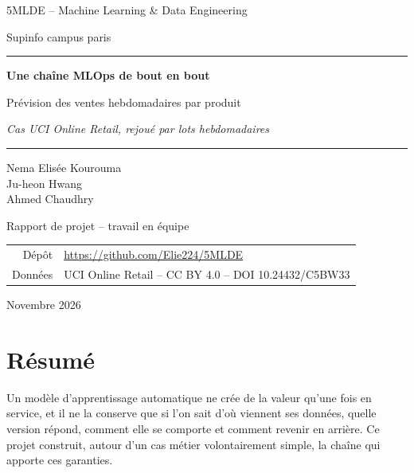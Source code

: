 \documentclass[11pt,a4paper]{article}
\newcommand{\auteur}{Nema Elisée Kourouma \\[2pt] Ju-heon Hwang \\[2pt] Ahmed Chaudhry}
\newcommand{\formation}{5MLDE -- Machine Learning \& Data Engineering}
\newcommand{\etablissement}{Supinfo campus paris}  %
\newcommand{\depot}{https://github.com/Elie224/5MLDE}
\newcommand{\datedoc}{Novembre 2026}
\begin{document}
\begin{titlepage}
  \centering
  \vspace*{1.5cm}
  {\large\color{gris}\formation\par}
  \vspace{0.3cm}
  {\large\color{gris}\etablissement\par}
  \vspace{2.2cm}
  {\color{bleu}\rule{\linewidth}{1pt}\par}
  \vspace{0.5cm}
  {\Huge\bfseries\color{bleu} Une chaîne MLOps de bout en bout\par}
  \vspace{0.4cm}
  {\LARGE Prévision des ventes hebdomadaires par produit\par}
  \vspace{0.3cm}
  {\large\itshape Cas UCI Online Retail, rejoué par lots hebdomadaires\par}
  \vspace{0.5cm}
  {\color{bleu}\rule{\linewidth}{1pt}\par}
  \vspace{2cm}
  {\Large \auteur\par}
  \vspace{0.4cm}
  {\large Rapport de projet -- travail en équipe\par}
  \vfill
  \begin{tabular}{rl}
    Dépôt & \url{\depot}\\
    Données & UCI Online Retail -- CC BY 4.0 -- DOI 10.24432/C5BW33\\
  \end{tabular}
  \vspace{1cm}

  {\large\datedoc\par}
\end{titlepage}

\section*{Résumé}

Un modèle d'apprentissage automatique ne crée de la valeur qu'une fois en service, et il
ne la conserve que si l'on sait d'où viennent ses données, quelle version répond, comment
elle se comporte et comment revenir en arrière. Ce projet construit, autour d'un cas
métier volontairement simple, la chaîne qui apporte ces garanties.
\end{document}
